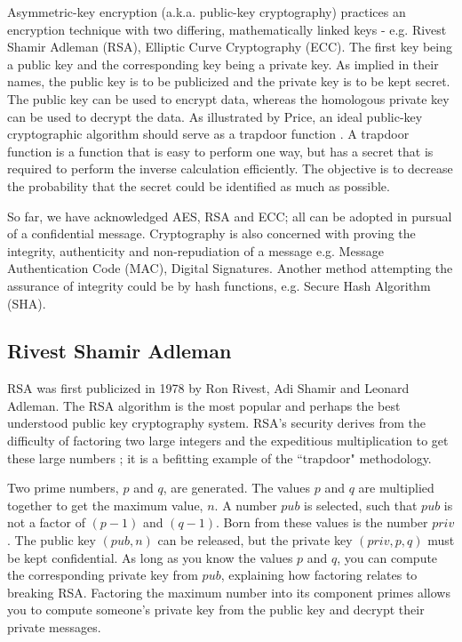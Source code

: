 Asymmetric-key encryption (a.k.a. public-key cryptography) practices an encryption technique with two differing, mathematically linked keys - e.g. Rivest Shamir Adleman (RSA), Elliptic Curve Cryptography (ECC). The first key being a public key and the corresponding key being a private key. As implied in their names, the public key is to be publicized and the private key is to be kept secret. The public key can be used to encrypt data, whereas the homologous private key can be used to decrypt the data. As illustrated by Price, an ideal public-key cryptographic algorithm should serve as a trapdoor function \cite{Understanding_Cryptog}. A trapdoor function is a function that is easy to perform one way, but has a secret that is required to perform the inverse calculation efficiently. The objective is to decrease the probability that the secret could be identified as much as possible.

So far, we have acknowledged AES, RSA and ECC; all can be adopted in pursual of a confidential message. Cryptography is also concerned with proving the integrity, authenticity and non-repudiation of a message e.g. Message Authentication Code (MAC), Digital Signatures. Another method attempting the assurance of integrity could be by hash functions, e.g. Secure Hash Algorithm (SHA).

\subsection{Rivest Shamir Adleman}
 RSA was first publicized in 1978 by Ron Rivest, Adi Shamir and Leonard Adleman. The RSA algorithm is the most popular and  perhaps the best understood public key cryptography system. RSA's security derives from the difficulty of factoring two large integers and the expeditious multiplication to get these large numbers \cite{RSA_ECC}; it is a befitting example of the ``trapdoor" methodology. 
 
 Two prime numbers, \(p\) and \(q\), are generated. The values \(p\) and \(q\) are multiplied together to get the maximum value, \(n\). 
 A number \(pub\) is selected, such that \(pub\) is not a factor of \((p - 1)\) and \((q - 1)\). %
 Born from these values is the number \(priv\).
 The public key \((pub,n)\) can be released, but the private key \((priv,p,q)\) must be kept confidential.
 As long as you know the values \(p\) and \(q\), you can compute the corresponding private key from \(pub\), explaining how factoring relates to breaking RSA. Factoring the maximum number into its component primes allows you to compute someone's private key from the public key and decrypt their private messages.

